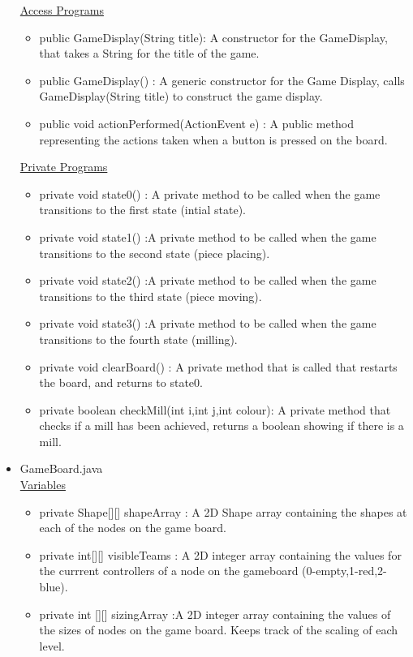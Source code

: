 \documentclass[12pt]{article}
\begin{document}
\begin{itemize}
\begin{itemize}
		\end{itemize}
		\underline{Access Programs}
		\begin{itemize}
			\item public GameDisplay(String title): A constructor for the GameDisplay, that takes a String for the title of the game.
			\item public GameDisplay() : A generic constructor for the Game Display, calls GameDisplay(String title) to construct the game display.
			\item public void actionPerformed(ActionEvent e) : A public method representing the actions taken when a button is pressed on the board.
		\end{itemize}
		\underline{Private Programs}
		\begin{itemize}
			\item private void state0() : A private method to be called when the game transitions to the first state (intial state).
			\item private void state1() :A private method to be called when the game transitions to the second state (piece placing).
			\item private void state2() :A private method to be called when the game transitions to the third state (piece moving).
			\item private void state3() :A private method to be called when the game transitions to the fourth state (milling).
			\item private void clearBoard() : A private method that is called that restarts the board, and returns to state0. 
			\item private boolean checkMill(int i,int j,int colour): A private method that checks if a mill has been achieved, returns a boolean showing if there is a mill.	
		\end{itemize}
		\item GameBoard.java \\
		\underline{Variables}
		\begin{itemize}
			\item private Shape[][] shapeArray : A 2D Shape array containing the shapes at each of the nodes on the game board. 
			\item private int[][] visibleTeams : A 2D integer array containing the values for the currrent controllers of a node on the gameboard (0-empty,1-red,2-blue).
			\item private int [][] sizingArray :A 2D integer array containing the values of the sizes of nodes on the game board. Keeps track of the scaling of each level.

\end{itemize}
\end{itemize}
\end{document}
